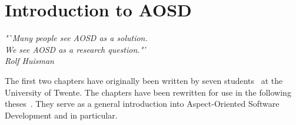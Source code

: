 \chapter{Introduction to AOSD}
\label{chp:AOSD}
\begin{flushright}
\textit{"`Many people see AOSD as a solution.}\\
\textit{We see AOSD as a research question."'}\\
\textit{Rolf Huisman}\\
\end{flushright}

The first two chapters have originally been written by seven \MSc students~\cite{Holljen2004, Durr2004, Vinkes2004, Bosman2004, Staijen2005, Havinga2005, Boschman2006} at the University of Twente.
The chapters have been rewritten for use in the following theses~\cite{VanOudheusden2006, Conradi2006, TeWinkel2006, Huttenhuis2006, Doornenbal2006, Huisman2006, SpenkelinkD2006}.
They serve as a general introduction into Aspect-Oriented Software Development and \Compose* in particular.



